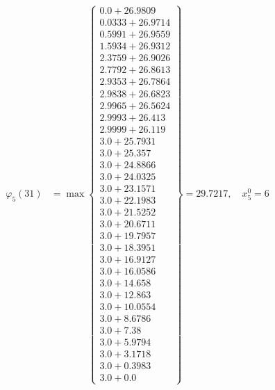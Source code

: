 \documentclass{article}
\begin{document}
\begin{align*}
\varphi_{5}(31) &= \max \left\{ \begin{array}{c}
0.0 + 26.9809 \\
 0.0333 + 26.9714 \\
 0.5991 + 26.9559 \\
 1.5934 + 26.9312 \\
 2.3759 + 26.9026 \\
 2.7792 + 26.8613 \\
 2.9353 + 26.7864 \\
 2.9838 + 26.6823 \\
 2.9965 + 26.5624 \\
 2.9993 + 26.413 \\
 2.9999 + 26.119 \\
 3.0 + 25.7931 \\
 3.0 + 25.357 \\
 3.0 + 24.8866 \\
 3.0 + 24.0325 \\
 3.0 + 23.1571 \\
 3.0 + 22.1983 \\
 3.0 + 21.5252 \\
 3.0 + 20.6711 \\
 3.0 + 19.7957 \\
 3.0 + 18.3951 \\
 3.0 + 16.9127 \\
 3.0 + 16.0586 \\
 3.0 + 14.658 \\
 3.0 + 12.863 \\
 3.0 + 10.0554 \\
 3.0 + 8.6786 \\
 3.0 + 7.38 \\
 3.0 + 5.9794 \\
 3.0 + 3.1718 \\
 3.0 + 0.3983 \\
 3.0 + 0.0
\end{array} \right\}=29.7217, \quad x_{5}^0=6\\
  

\end{align*}
\end{document}
